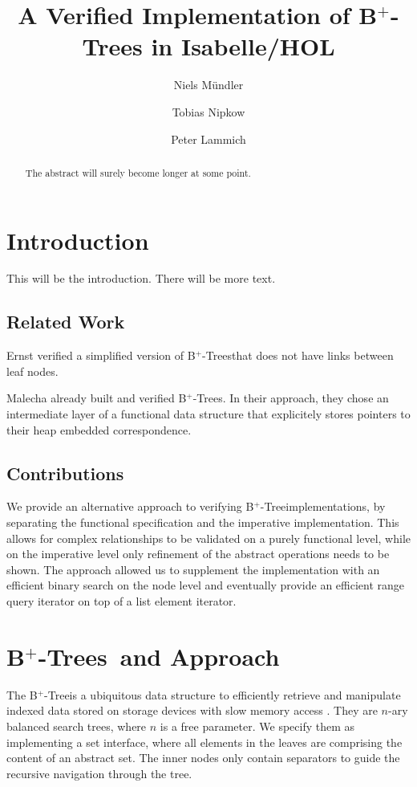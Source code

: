 \documentclass[a4paper,UKenglish,cleveref, autoref, thm-restate]{lipics-v2021}
\title{A Verified Implementation of B$^+$-Trees in Isabelle/HOL} %
\author{Niels Mündler}{Department of Computer Science, ETH Zurich, Switzerland}{n.muendler@tum.de}{https://orcid.org/0000-0003-3851-2557}{}%
\author{Tobias Nipkow}{Department of Informatics, Technical University of Munich, Germany}{nipkow@in.tum.de}{https://orcid.org/0000-0003-0730-515X}{}
\author{Peter Lammich}{Department of Computer Science, The University of Manchester, Great-Britain}{lammich@in.tum.de}{https://orcid.org/0000-0003-3576-0504}{}
\newcommand{\btree}{B$^+$-Tree}
\newcommand{\btrees}{B$^+$-Trees}
\begin{document}
\maketitle

\begin{abstract}
    The abstract will surely become longer at some point.
\end{abstract}

\section{Introduction}
\label{sec:introduction}

This will be the introduction. There will be more text.

\subsection{Related Work}
\label{sec:related_work}

Ernst verified a simplified version of \btrees that does
not have links between leaf nodes.

Malecha already built and verified \btrees \cite{}.
In their approach, they chose an intermediate layer of a functional
data structure that explicitely stores pointers to their heap embedded
correspondence.

\subsection{Contributions}
\label{sec:contributions}

We provide an alternative approach to verifying \btree implementations,
by separating the functional specification and the imperative implementation.
This allows for complex relationships to be validated on a purely
functional level, while on the imperative level
only refinement of the abstract operations needs to be shown.
The approach allowed us to supplement the implementation
with an efficient binary search on the node level
and eventually provide an efficient range query iterator
on top of a list element iterator.


\section{\btrees\ and Approach}
\label{sec:approach}

The \btree is a ubiquitous data structure to efficiently retrieve and manipulate
indexed data stored on storage devices with slow memory access \cite{DBLP:journals/csur/Comer79}.
They are $n$-ary balanced search trees, where $n$ is a free parameter.
We specify them as implementing a set interface,
where all elements in the leaves are comprising the content of an abstract set.
The inner nodes only contain separators to guide the recursive navigation through the tree.
\end{document}

